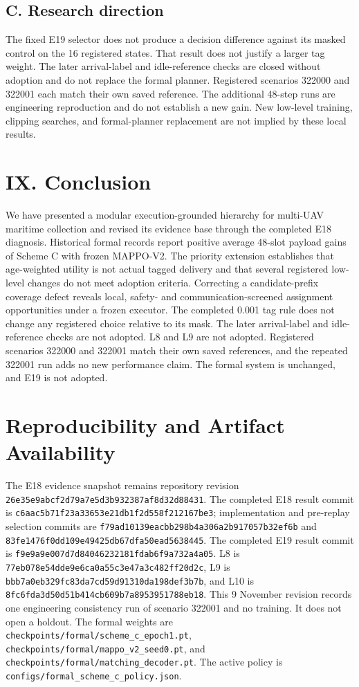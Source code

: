 \subsection*{C. Research direction}

The fixed E19 selector does not produce a decision difference against its masked control on the 16 registered states. That result does not justify a larger tag weight. The later arrival-label and idle-reference checks are closed without adoption and do not replace the formal planner. Registered scenarios 322000 and 322001 each match their own saved reference. The additional 48-step runs are engineering reproduction and do not establish a new gain. New low-level training, clipping searches, and formal-planner replacement are not implied by these local results.

\section*{IX. Conclusion}

We have presented a modular execution-grounded hierarchy for multi-UAV maritime collection and revised its evidence base through the completed E18 diagnosis. Historical formal records report positive average 48-slot payload gains of Scheme C with frozen MAPPO-V2. The priority extension establishes that age-weighted utility is not actual tagged delivery and that several registered low-level changes do not meet adoption criteria. Correcting a candidate-prefix coverage defect reveals local, safety- and communication-screened assignment opportunities under a frozen executor. The completed 0.001 tag rule does not change any registered choice relative to its mask. The later arrival-label and idle-reference checks are not adopted. L8 and L9 are not adopted. Registered scenarios 322000 and 322001 match their own saved references, and the repeated 322001 run adds no new performance claim. The formal system is unchanged, and E19 is not adopted.

\section*{Reproducibility and Artifact Availability}

The E18 evidence snapshot remains repository revision \nolinkurl{26e35e9abcf2d79a7e5d3b932387af8d32d88431}. The completed E18 result commit is \nolinkurl{c6aac5b71f23a33653e21db1f2d558f212167be3}; implementation and pre-replay selection commits are \nolinkurl{f79ad10139eacbb298b4a306a2b917057b32ef6b} and \nolinkurl{83fe1476f0dd109e49425db67dfa50ead5638445}. The completed E19 result commit is \nolinkurl{f9e9a9e007d7d84046232181fdab6f9a732a4a05}. L8 is \nolinkurl{77eb078e54dde9e6ca0a55c3e47a3c482ff20d2c}, L9 is \nolinkurl{bbb7a0eb329fc83da7cd59d91310da198def3b7b}, and L10 is \nolinkurl{8fc6fda3d50d51b414cb609b7a8953951788eb18}. This 9 November revision records one engineering consistency run of scenario 322001 and no training. It does not open a holdout. The formal weights are \nolinkurl{checkpoints/formal/scheme_c_epoch1.pt}, \nolinkurl{checkpoints/formal/mappo_v2_seed0.pt}, and \nolinkurl{checkpoints/formal/matching_decoder.pt}. The active policy is \nolinkurl{configs/formal_scheme_c_policy.json}.

